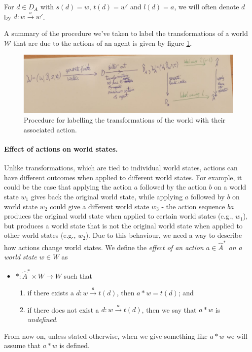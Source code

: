 For $d \in D_{A}$ with $s(d) = w$, $t(d) = w'$ and $l(d) = a$, we will often denote $d$ by $d: w \xrightarrow{a} w'$.

A summary of the procedure we've taken to label the transformations of a world $\mathscr{W}$ that are due to the actions of an agent is given by figure \ref{fig:action_labelling_procedure}.

\begin{figure}
    \centering
    \includegraphics[width=\linewidth]{2MathematicalFramework/InitialFramework/Images/action_labelling_procedure.jpeg}
    \caption{Procedure for labelling the transformations of the world with their associated action.}
    \label{fig:action_labelling_procedure}
\end{figure}


\paragraph{Effect of actions on world states.}
Unlike transformations, which are tied to individual world states, actions can have different outcomes when applied to different world states.
For example, it could be the case that applying the action $a$ followed by the action $b$ on a world state $w_{1}$ gives back the original world state, while applying $a$ followed by $b$ on world state $w_{2}$ could give a different world state $w_{3}$ - the action sequence $ba$ produces the original world state when applied to certain world states (e.g., $w_{1}$), but produces a world state that is not the original world state when applied to other world states (e.g., $w_{2}$).
Due to this behaviour, we need a way to describe how actions change world states.
We define the \emph{effect of an action $a \in \hat{A}^{\ast}$ on a world state $w \in W$} as

\begin{itemize}
    \item[] $\ast: \hat{A}^{\ast} \times W \to W$ such that
          \begin{enumerate}[(1)]
              \item if there exists a $d: w \xrightarrow{a} t(d)$, then $a \ast w = t(d)$; and
              \item if there does not exist a $d: w \xrightarrow{a} t(d)$, then we say that $a \ast w$ is \emph{undefined}.
          \end{enumerate}
\end{itemize}
From now on, unless stated otherwise, when we give something like $a \ast w$ we will assume that $a \ast w$ is defined.

